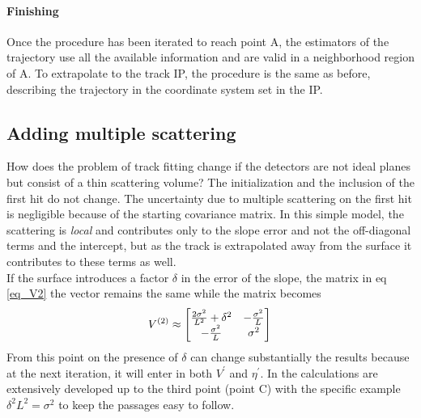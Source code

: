 \begin{refsection}
\paragraph{Finishing} Once the procedure has been iterated  to reach point A, 
the estimators of the trajectory use all the available information and are valid in a neighborhood region of A. 
To extrapolate to the track IP, 
the procedure is the same as before, 
describing the trajectory in the coordinate system set in the IP. 

\subsection{Adding multiple scattering}
How does the problem of track fitting change if the detectors are not ideal planes but consist of a thin scattering volume? 
The initialization and the inclusion of the first hit do not change. 
The uncertainty due to multiple scattering on the first hit is negligible because of the starting covariance matrix. 
In this simple model, the scattering is \textit{local} and contributes only to the slope error and not the off-diagonal terms 
and the intercept, but as the track is extrapolated away from the surface it contributes to these terms as well.\\
If the surface introduces a factor $\delta$ in the error of the slope, 
the matrix in eq \ref{eq_V2} the vector remains the same while the matrix becomes
$$
V^{(2)}\approx
\begin{bmatrix}
\frac{2\sigma^2}{L^2}+\delta^2 & -\frac{\sigma^2}{L} \\
-\frac{\sigma^2}{L} & \sigma^2
\end{bmatrix}\\
$$
From this point on the presence of $\delta$ can change substantially the results because at the next iteration, it will enter in both $V^\prime$ and $\eta^\prime$.
 In \cite{KutschkePaper} the calculations are extensively developed up to the third point (point C) 
 with the specific example $\delta^2L^2=\sigma^2$ to keep the passages easy to follow.

\printbibliography[
    heading = bibliographychapter,
    title=Bibliography on Kalman filter
]

\end{refsection}